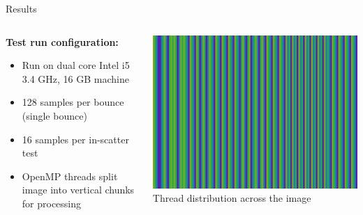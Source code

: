 \documentclass[10pt,compress,professionalfont]{beamer}
\begin{document}
\begin{frame}{Results}



    \vspace{5mm}


    \begin{columns}
        \begin{column}{0.6\textwidth}
            {\bf Test run configuration:}
            \begin{itemize}
                \item Run on dual core Intel i5 3.4 GHz, 16 GB machine\\
                \vspace{2mm}
                \item 128 samples per bounce (single bounce)\\
                \vspace{2mm}
                \item 16 samples per in-scatter test\\
                \vspace{2mm}
                \item OpenMP threads split image into vertical chunks for processing\\
            \end{itemize}

        \end{column}
        \begin{column}{0.4\textwidth}

            {\centering
            \includegraphics[width=\textwidth]{../img/threads}\\
            {\centering\scriptsize Thread distribution across the image\\}
            }
        \end{column}
    \end{columns}
\end{frame}
\end{document}
